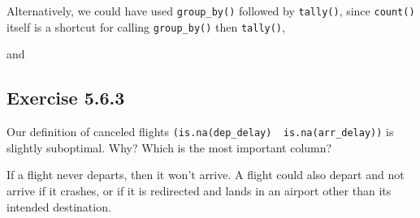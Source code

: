 \documentclass[]{book}
\newenvironment{Shaded}{\begin{snugshade}}{\end{snugshade}}
\newcommand{\CommentTok}[1]{\textcolor[rgb]{0.56,0.35,0.01}{\textit{#1}}}
\newcommand{\KeywordTok}[1]{\textcolor[rgb]{0.13,0.29,0.53}{\textbf{#1}}}
\newcommand{\NormalTok}[1]{#1}
\newcommand{\OperatorTok}[1]{\textcolor[rgb]{0.81,0.36,0.00}{\textbf{#1}}}
\newcommand{\StringTok}[1]{\textcolor[rgb]{0.31,0.60,0.02}{#1}}
\theoremstyle{plain}
\theoremstyle{remark}
\theoremstyle{definition}
\theoremstyle{definition}
\theoremstyle{definition}
\theoremstyle{remark}
\begin{document}
Alternatively, we could have used \texttt{group\_by()} followed by
\texttt{tally()}, since \texttt{count()} itself is a shortcut for
calling \texttt{group\_by()} then \texttt{tally()},

\begin{Shaded}
\end{Shaded}

and

\begin{Shaded}
\end{Shaded}

\hypertarget{exercise-5.6.3}{%
\subsection*{\texorpdfstring{Exercise
{5.6.3}}{Exercise 5.6.3}}\label{exercise-5.6.3}}

Our definition of canceled flights
\texttt{(is.na(dep\_delay)\ \textbar{}\ is.na(arr\_delay))} is slightly
suboptimal. Why? Which is the most important column?

If a flight never departs, then it won't arrive. A flight could also
depart and not arrive if it crashes, or if it is redirected and lands in
an airport other than its intended destination.
\end{document}
